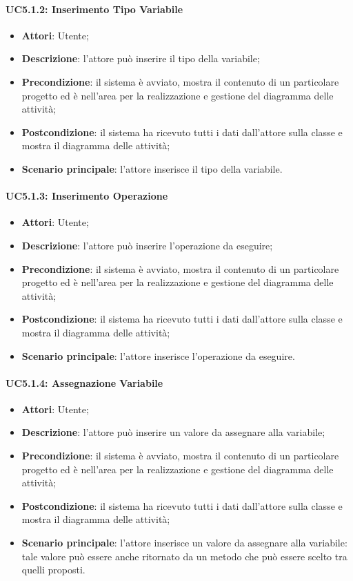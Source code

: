\paragraph{UC5.1.2: Inserimento Tipo Variabile}
\label{UC5.1.2}
\begin{itemize}
	\item \textbf{Attori}: Utente;
	\item \textbf{Descrizione}: l'attore può inserire il tipo della variabile;
	\item \textbf{Precondizione}: il sistema è avviato, mostra il contenuto di un particolare progetto ed è nell'area per la realizzazione e gestione del diagramma delle attività;
	\item \textbf{Postcondizione}: il sistema ha ricevuto tutti i dati dall'attore sulla classe e mostra il diagramma delle attività;
	\item \textbf{Scenario principale}: l'attore inserisce il tipo della variabile.
\end{itemize}

\paragraph{UC5.1.3: Inserimento Operazione}
\label{UC5.1.3}
\begin{itemize}
	\item \textbf{Attori}: Utente;
	\item \textbf{Descrizione}: l'attore può inserire l'operazione da eseguire;
	\item \textbf{Precondizione}: il sistema è avviato, mostra il contenuto di un particolare progetto ed è nell'area per la realizzazione e gestione del diagramma delle attività;
	\item \textbf{Postcondizione}: il sistema ha ricevuto tutti i dati dall'attore sulla classe e mostra il diagramma delle attività;
	\item \textbf{Scenario principale}: l'attore inserisce l'operazione da eseguire.
\end{itemize}

\paragraph{UC5.1.4: Assegnazione Variabile}
\label{UC5.1.4}
\begin{itemize}
	\item \textbf{Attori}: Utente;
	\item \textbf{Descrizione}: l'attore può inserire un valore da assegnare alla variabile;
	\item \textbf{Precondizione}: il sistema è avviato, mostra il contenuto di un particolare progetto ed è nell'area per la realizzazione e gestione del diagramma delle attività;
	\item \textbf{Postcondizione}: il sistema ha ricevuto tutti i dati dall'attore sulla classe e mostra il diagramma delle attività;
	\item \textbf{Scenario principale}: l'attore inserisce un valore da assegnare alla variabile: tale valore può essere anche ritornato da un metodo che può essere scelto tra quelli proposti.
\end{itemize}

